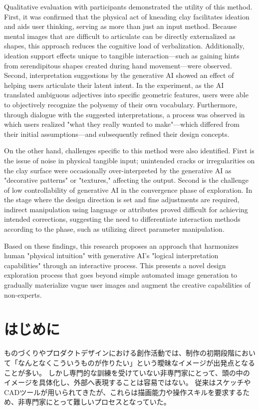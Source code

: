 \documentclass{kuisthesis}
\begin{document}
\begin{eabstract}
Qualitative evaluation with participants demonstrated the utility of this method. 
First, it was confirmed that the physical act of kneading clay facilitates ideation and aids user thinking, serving as more than just an input method. 
Because mental images that are difficult to articulate can be directly externalized as shapes, this approach reduces the cognitive load of verbalization. 
Additionally, ideation support effects unique to tangible interaction—such as gaining hints from serendipitous shapes created during hand movement—were observed. 
Second, interpretation suggestions by the generative AI showed an effect of helping users articulate their latent intent. 
In the experiment, as the AI translated ambiguous adjectives into specific geometric features, users were able to objectively recognize the polysemy of their own vocabulary. 
Furthermore, through dialogue with the suggested interpretations, a process was observed in which users realized "what they really wanted to make"—which differed from their initial assumptions—and subsequently refined their design concepts.

On the other hand, challenges specific to this method were also identified. 
First is the issue of noise in physical tangible input; unintended cracks or irregularities on the clay surface were occasionally over-interpreted by the generative AI as "decorative patterns" or "textures," affecting the output. 
Second is the challenge of low controllability of generative AI in the convergence phase of exploration. In the stage where the design direction is set and fine adjustments are required, indirect manipulation using language or attributes proved difficult for achieving intended corrections, suggesting the need to differentiate interaction methods according to the phase, such as utilizing direct parameter manipulation.

Based on these findings, this research proposes an approach that harmonizes human "physical intuition" with generative AI's "logical interpretation capabilities" through an interactive process. 
This presents a novel design exploration process that goes beyond simple automated image generation to gradually materialize vague user images and augment the creative capabilities of non-experts.
\end{eabstract}
\tableofcontents %

\section{はじめに}
ものづくりやプロダクトデザインにおける創作活動では、制作の初期段階において「なんとなくこういうものが作りたい」という曖昧なイメージが出発点となることが多い。
しかし専門的な訓練を受けていない非専門家にとって、頭の中のイメージを具体化し、外部へ表現することは容易ではない。
従来はスケッチやCADツールが用いられてきたが、これらは描画能力や操作スキルを要求するため、非専門家にとって難しいプロセスとなっていた。
\end{document}
